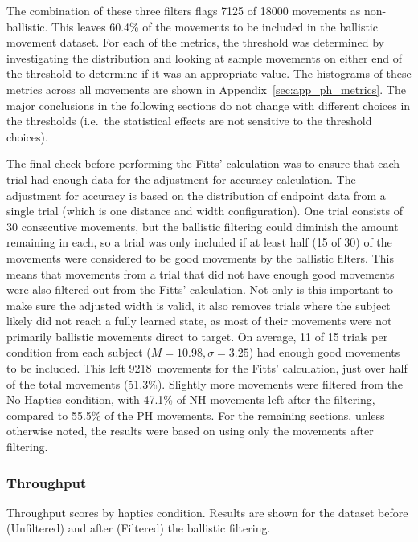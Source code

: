 The combination of these three filters flags 7125 of 18000 movements as non-ballistic.
This leaves 60.4\% of the movements to be included in the ballistic movement dataset.
For each of the metrics, the threshold was determined by investigating the distribution and looking at sample movements on either end of the threshold to determine if it was an appropriate value.
The histograms of these metrics across all movements are shown in Appendix~\ref{sec:app_ph_metrics}.
The major conclusions in the following sections do not change with different choices in the thresholds (i.e.\ the statistical effects are not sensitive to the threshold choices).

The final check before performing the Fitts' calculation was to ensure that each trial had enough data for the adjustment for accuracy calculation.
The adjustment for accuracy is based on the distribution of endpoint data from a single trial (which is one distance and width configuration).
One trial consists of 30 consecutive movements, but the ballistic filtering could diminish the amount remaining in each, so a trial was only included if at least half (15 of 30) of the movements were considered to be good movements by the ballistic filters.
This means that movements from a trial that did not have enough good movements were also filtered out from the Fitts' calculation.
Not only is this important to make sure the adjusted width is valid, it also removes trials where the subject likely did not reach a fully learned state, as most of their movements were not primarily ballistic movements direct to target.
On average, 11 of 15 trials per condition from each subject ($M=10.98, \sigma=3.25$) had enough good movements to be included.
This left 9218~movements for the Fitts' calculation, just over half of the total movements (51.3\%).
Slightly more movements were filtered from the No Haptics condition, with 47.1\% of NH movements left after the filtering, compared to 55.5\% of the PH movements.
For the remaining sections, unless otherwise noted, the results were based on using only the movements after filtering.

\subsubsection{Throughput}

\begin{table}
    \centering
    \caption{Throughput scores by haptics condition. Results are shown for the dataset before (Unfiltered) and after (Filtered) the ballistic filtering.}
    \label{tab:ph_throughput_fulltable}
\end{table}

